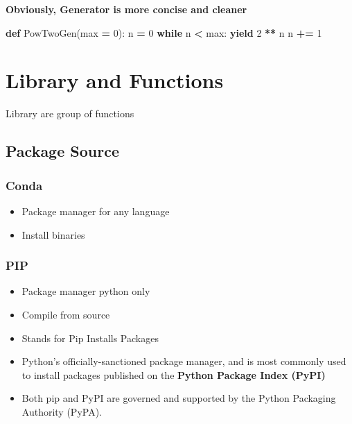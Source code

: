\documentclass[
]{book}
\newenvironment{Shaded}{\begin{snugshade}}{\end{snugshade}}
\newcommand{\BuiltInTok}[1]{#1}
\newcommand{\ControlFlowTok}[1]{\textcolor[rgb]{0.27,0.27,0.27}{\textbf{#1}}}
\newcommand{\DecValTok}[1]{\textcolor[rgb]{0.06,0.06,0.06}{#1}}
\newcommand{\KeywordTok}[1]{\textcolor[rgb]{0.27,0.27,0.27}{\textbf{#1}}}
\newcommand{\NormalTok}[1]{#1}
\newcommand{\OperatorTok}[1]{\textcolor[rgb]{0.43,0.43,0.43}{\textbf{#1}}}
\providecommand{\tightlist}{%
  \setlength{\itemsep}{0pt}\setlength{\parskip}{0pt}}
\begin{document}
\textbf{Obviously, Generator is more concise and cleaner}

\begin{Shaded}
\begin{Highlighting}[]
\KeywordTok{def}\NormalTok{ PowTwoGen(}\BuiltInTok{max} \OperatorTok{=} \DecValTok{0}\NormalTok{):}
\NormalTok{    n }\OperatorTok{=} \DecValTok{0}
    \ControlFlowTok{while}\NormalTok{ n }\OperatorTok{\textless{}} \BuiltInTok{max}\NormalTok{:}
        \ControlFlowTok{yield} \DecValTok{2} \OperatorTok{**}\NormalTok{ n}
\NormalTok{        n }\OperatorTok{+=} \DecValTok{1}
\end{Highlighting}
\end{Shaded}

\hypertarget{library-and-functions}{%
\chapter{Library and Functions}\label{library-and-functions}}

Library are group of functions

\hypertarget{package-source}{%
\section{Package Source}\label{package-source}}

\hypertarget{conda-1}{%
\subsection{Conda}\label{conda-1}}

\begin{itemize}
\tightlist
\item
  Package manager for any language\\
\item
  Install binaries
\end{itemize}

\hypertarget{pip-1}{%
\subsection{PIP}\label{pip-1}}

\begin{itemize}
\tightlist
\item
  Package manager python only\\
\item
  Compile from source\\
\item
  Stands for Pip Installs Packages\\
\item
  Python's officially-sanctioned package manager, and is most commonly used to install packages published on the \textbf{Python Package Index (PyPI)}\\
\item
  Both pip and PyPI are governed and supported by the Python Packaging Authority (PyPA).
\end{itemize}
\end{document}
